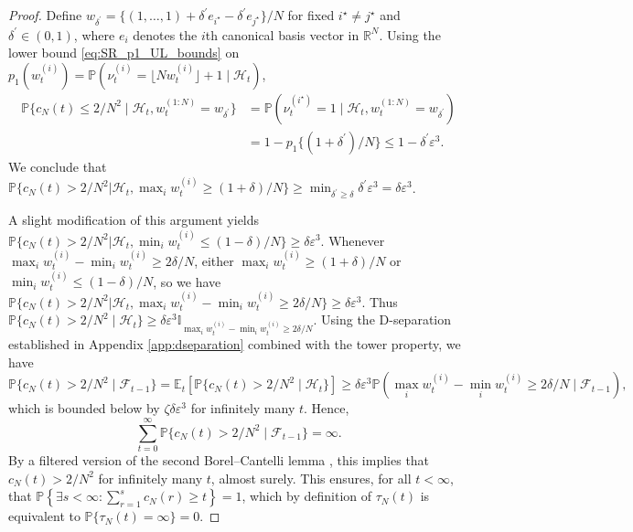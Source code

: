 \documentclass{article}
\newcommand{\Prob}{\mathbb{P}}
\newcommand{\Et}{\mathbb{E}_t}
\newcommand{\1}[1]{\mathbb{I}_{#1}}
\newcommand{\flnw}{\lfloor N w_t^{(i)} \rfloor}
\begin{document}
\begin{proof}
Define $w_{\delta^\prime} = \{(1,\dots,1) + \delta^\prime e_{i^\star} - \delta^\prime e_{j^\star} \} /N$ for fixed $i^\star \neq j^\star$ and $\delta^\prime \in (0,1)$, where $e_i$ denotes the $i$th canonical basis vector in $\mathbb{R}^N$. 
Using the lower bound \eqref{eq:SR_p1_UL_bounds} on $p_1(w_t^{(i)}) = \Prob(\nu_t^{(i)} = \flnw +1 \mid \mathcal{H}_t)$,
\begin{align*}
\Prob\{ c_N(t) \leq 2/N^2 \mid \mathcal{H}_t, w_t^{(1:N)} = w_{\delta^\prime} \}
&= \Prob( \nu_t^{(i^\star)} = 1 \mid \mathcal{H}_t, w_t^{(1:N)} = w_{\delta^\prime} ) \\
&= 1-p_1\{ (1+\delta^\prime)/N \}
\leq 1- \delta^\prime \varepsilon^3 .
\end{align*}
We conclude that $\Prob\{ c_N(t) > 2/N^2 | \mathcal{H}_t, \max_i w_t^{(i)} \geq (1+\delta)/N \} \geq \min_{\delta^\prime \geq \delta} \delta^\prime\varepsilon^3 = \delta\varepsilon^3$.

A slight modification of this argument yields $\Prob\{ c_N(t) > 2/N^2 | \mathcal{H}_t, \min_i w_t^{(i)} \leq (1-\delta)/N \} \geq \delta\varepsilon^3$.
Whenever $\max_i w_t^{(i)} - \min_i w_t^{(i)} \geq 2\delta/N$, either $\max_i w_t^{(i)} \geq (1+\delta)/N$ or $\min_i w_t^{(i)} \leq (1-\delta)/N$, so we have 
$\Prob\{ c_N(t) > 2/N^2 | \mathcal{H}_t, \max_i w_t^{(i)} - \min_i w_t^{(i)} \geq 2\delta/N \} \geq \delta\varepsilon^3$.
Thus $ \Prob\{ c_N(t)>2/N^2 \mid \mathcal{H}_t \} \geq \delta\varepsilon^3 \1{\max_i w_t^{(i)} - \min_i w_t^{(i)} \geq 2\delta/N}$.
Using the D-separation established in Appendix \ref{app:dseparation} combined with the tower property, we have
\begin{equation*}
\Prob\{ c_N(t)>2/N^2 \mid \mathcal{F}_{t-1} \}
=\Et[ \Prob\{ c_N(t)>2/N^2 \mid \mathcal{H}_t \} ] 
\geq \delta\varepsilon^3 \Prob( \max_i w_t^{(i)} - \min_i w_t^{(i)} \geq 2\delta/N \mid \mathcal{F}_{t-1} ) ,
\end{equation*}
which is bounded below by $ \zeta \delta \varepsilon^3 $ for infinitely many $t$. 
Hence,
\begin{equation*}
\sum_{t=0}^\infty \Prob\{ c_N(t) > 2/N^2 \mid \mathcal{F}_{t-1} \} = \infty .
\end{equation*}
By a filtered version of the second Borel--Cantelli lemma \citep[see for example][Theorem 4.3.4]{durrett2019}, this implies that $c_N(t) >2/N^2$ for infinitely many $t$, almost surely.
This ensures, for all $t <\infty$, that $\Prob\left\{ \exists s<\infty : \sum_{r=1}^s c_N(r) \geq t \right\} =1$, which by definition of $\tau_N(t)$ is equivalent to $\Prob\{ \tau_N(t) = \infty \} =0$.
\end{proof}


\end{document}
